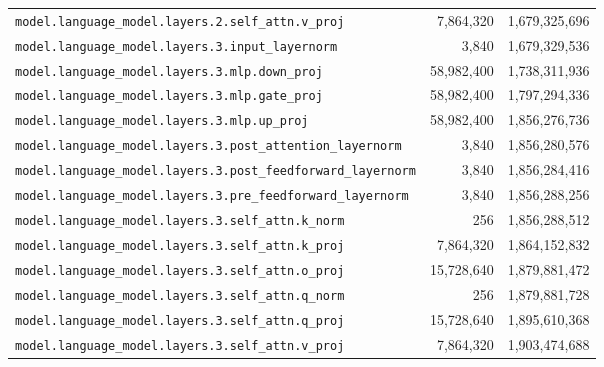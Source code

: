 \documentclass[10pt,a4paper]{article}
\theoremstyle{definition}
\begin{document}
\begin{appendices}
\begin{longtable}{p{9.5cm}rr}
\texttt{model.\allowbreak{}language\_model.\allowbreak{}layers.\allowbreak{}2.\allowbreak{}self\_attn.\allowbreak{}v\_proj} & 7,864,320 & 1,679,325,696 \\
\texttt{model.\allowbreak{}language\_model.\allowbreak{}layers.\allowbreak{}3.\allowbreak{}input\_layernorm} & 3,840 & 1,679,329,536 \\
\texttt{model.\allowbreak{}language\_model.\allowbreak{}layers.\allowbreak{}3.\allowbreak{}mlp.\allowbreak{}down\_proj} & 58,982,400 & 1,738,311,936 \\
\texttt{model.\allowbreak{}language\_model.\allowbreak{}layers.\allowbreak{}3.\allowbreak{}mlp.\allowbreak{}gate\_proj} & 58,982,400 & 1,797,294,336 \\
\texttt{model.\allowbreak{}language\_model.\allowbreak{}layers.\allowbreak{}3.\allowbreak{}mlp.\allowbreak{}up\_proj} & 58,982,400 & 1,856,276,736 \\
\texttt{model.\allowbreak{}language\_model.\allowbreak{}layers.\allowbreak{}3.\allowbreak{}post\_attention\_layernorm} & 3,840 & 1,856,280,576 \\
\texttt{model.\allowbreak{}language\_model.\allowbreak{}layers.\allowbreak{}3.\allowbreak{}post\_feedforward\_layernorm} & 3,840 & 1,856,284,416 \\
\texttt{model.\allowbreak{}language\_model.\allowbreak{}layers.\allowbreak{}3.\allowbreak{}pre\_feedforward\_layernorm} & 3,840 & 1,856,288,256 \\
\texttt{model.\allowbreak{}language\_model.\allowbreak{}layers.\allowbreak{}3.\allowbreak{}self\_attn.\allowbreak{}k\_norm} & 256 & 1,856,288,512 \\
\texttt{model.\allowbreak{}language\_model.\allowbreak{}layers.\allowbreak{}3.\allowbreak{}self\_attn.\allowbreak{}k\_proj} & 7,864,320 & 1,864,152,832 \\
\texttt{model.\allowbreak{}language\_model.\allowbreak{}layers.\allowbreak{}3.\allowbreak{}self\_attn.\allowbreak{}o\_proj} & 15,728,640 & 1,879,881,472 \\
\texttt{model.\allowbreak{}language\_model.\allowbreak{}layers.\allowbreak{}3.\allowbreak{}self\_attn.\allowbreak{}q\_norm} & 256 & 1,879,881,728 \\
\texttt{model.\allowbreak{}language\_model.\allowbreak{}layers.\allowbreak{}3.\allowbreak{}self\_attn.\allowbreak{}q\_proj} & 15,728,640 & 1,895,610,368 \\
\texttt{model.\allowbreak{}language\_model.\allowbreak{}layers.\allowbreak{}3.\allowbreak{}self\_attn.\allowbreak{}v\_proj} & 7,864,320 & 1,903,474,688 \\

\end{longtable}
\end{appendices}
\end{document}
